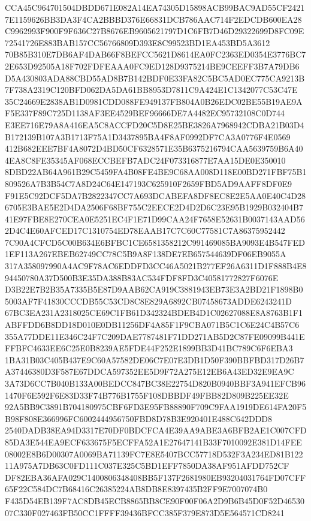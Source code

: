 \documentclass[UTF8,fontset=fandol,zihao=-4,a4paper]{ctexart}
\begin{document}
{{CCA45C964701504DBDD671E082A14EA74305D15898ACB99BAC9AD55CF24217E1159626BB3DA3F4CA2BBBD376E66831DCB786AAC714F2EDCDB600EA28
C9962993F900F9F636C27B8676EB9605621797D1C6FB7D46D29322699D8FC09E72541726E883BAB157CC56766809D393E8C99523BD1EA453BD5A3612
70B85B310E7DB6AF4DAB66F8BEFCC5621D8614EA0FC2363ED0354E3776BC72E653D92505A18F702FDFEAAA0FC9ED128D9375214BE9CEEFF3B7A79DB6
D5A430803ADA88CBD55AD8B7B142BDF0E33FA82C5BC5AD0EC775CA9213B7F738A2319C120BFD062DA5DA61BB8953D7811C9A424E1C1342077C53C47E
35C24669E2838AB1D0981CDD088FE949137FB804A0B26EDC02BE55B19AE9AF5E337F89C725D1138AF3EE4529BEF96666DE7A4482EC95732108C0D744
E3EE716E79A8A416EA5C8ACCFD20C5D8E25BE3826A7968942CDBA21B03D4B172139B107A3B1713F75A1D3437895BA4F8AF0992DF7CA3A0776F4E0569
412B682EEE7BF4A8072D4BD50CF6328571E35B6375216794CAA5639759B6A404EA8C8FE35345AF068ECCBEFB7ADC24F073316877E7AA15DE0E350010
8DBD22AB64A961B29C5459FA4B08FE4BE9C68AA008D118E00BD271FBF75B1809526A7B3B54C7A8D24C64E147193C625910F2659FBD5AD9AAFF8DF0E9
F91E5C92DCF5DA7B2822347CC7A693DCABEFA8DF8EC8E2E5AA0E40C4D286705E3BAE5E2D4DA2506F68BF755C2EECE2D4D2D6C23E95B1929B032404B7
41E97FBE8E270CEA0E5251EC4F1E71D99CAA24F7658E52631B0037143AAD562D4C4E60AFCED17C1310754ED78EAAB17C7C60C77581C7A86375952442
7C90A4CFCD5C00B634E6BFBC1CE6581358212C991469085BA9093E4B547FED1EF113A267EBEB62749CC78C5B9A8F138DE7EB657544639DF06EB9055A
317A358097990A4AC9F78AC6EDDFD3CC46A5021B277EF26A6311D1F888B4E894450780A37D500B3E35DA388B83AC534FDF8FD3C40581772827F6076E
D3B22E7B2B35A7335B5E87D9AAB62CA919C3881943EB73E3A2BD21F1898B05003AF7F41830CCCDB55C53CD8C8E829A6892CB07458673ADDE6243241D
67BC3EA231A2318025CE69C1FB61D342324BDEB4D1C02627088E8A8763B1F1ABFFDD6B8DD18D010E0DB11256DF4A85F1F9CBA071B5C1C6E24C4B57C6
355A77DDE11E346C24F7C209DAE7787481F71DD271AB5D2C87FE09099B441EFFBFC4633EE6C25E0B8239AE5FDE44F252E1899BB3D41BC789C6F6EBA3
1BA31B03C405B437E9C60A57582DE06C7E07E3DB1D50F390BBFBD317D26B7A37446380D3F587E67DDCA597352EE5D9F72A275E12EB6A43ED32E9EA9C
3A73D6CC7B040B133A00BEDCC847BC38E22754D820B0940BBF3A941EFCB961470F6E592F6E83D33F74B776B1755F108DBBDF49FBB82D809B225EE32E
92A5BB9C3891B704180975CBF6FD3E95FB88890F709C9FAA1919DE614FA20F5B98F808E366996FC6002444956750FBD8D78B3E920401E488C642DDD8
2540DADB38EA94D3317E70DF0BDCFCA4E39AA9ABE3A6BFB2AE1C007CFD85DA3E544EA9ECF633675F5ECFFA52A1E27647141B33F7010092E381D14FEE
08002E8B6D00307A0069BA71139FC7E8E5407BCC57718D532F3A234ED81B12211A975A7DB63C0FD111C037E325C5BD1EFF7850DA38AF951AFDD752CF
DF82EBA36AFA029C1400806348408BB5F137F2681980EB93204031764FD07CFF65F22C584DC7B68416C26385224AB8DB8E8397435B2FF9E7007074B0
F435D54EB139F7AC8DB45ECB8865BB8CE90F00F06A2D9B6B45D0F52D4653007C330F027463FB50CC1FFFF39436BFCC385F379E873D5E564571CD8241
}}
\end{document}
